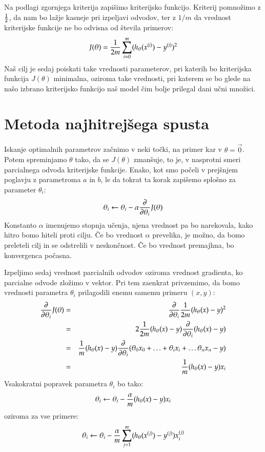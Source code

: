 Na podlagi zgornjega kriterija zapišimo kriterijsko funkcijo. Kriterij
pomnožimo z $1\over 2$, da nam bo lažje kasneje pri izpeljavi odvodov, ter z $1/m$ da vrednost kriterijske funkcije ne bo odvisna od števila primerov:
%
\begin{equation}
J(\theta)={1\over 2m}\sum_{i=0}^m(h_\theta(x^{(i)})-y^{(i)})^2
\end{equation}
%
Naš cilj je sedaj poiskati take vrednosti parameterov, pri katerih bo
kriterijska funkcija $J(\theta)$ minimalna, oziroma take vrednosti,
pri katerem se bo glede na našo izbrano kriterijsko funkcijo naš
model čim bolje prilegal dani učni množici. 

\section{Metoda najhitrejšega spusta}

Iskanje optimalnih parametrov začnimo v neki točki, na primer kar v
$\theta=\vec{0}$. Potem spreminjamo $\theta$ tako, da se $J(\theta)$
zmanšuje, to je, v nasprotni smeri parcialnega odvoda kriterijske
funkcije. Enako, kot smo počeli v prejšnjem poglavju z parametroma $a$
in $b$, le da tokrat ta korak zapišemo splošno za parameter $\theta_i$:
\begin{equation}
  \theta_i\leftarrow\theta_i-\alpha{\partial\over\partial\theta_i}J(\theta)
\end{equation}
%
Konstanto $\alpha$ imenujemo stopnja učenja, njena vrednost pa bo
narekovala, kako hitro bomo hiteli proti cilju. Če bo vrednost
$\alpha$ prevelika, je možno, da bomo preleteli cilj in se odstrelili v
neskončnost. Če bo vrednost premajhna, bo konvergenca počasna.

Izpeljimo sedaj vrednost parcialnih odvodov oziroma vrednost
gradienta, ko parcialne odvode zložimo v vektor. Pri tem zaenkrat privzemimo, da bomo vrednosti parametra $\theta_i$ prilagodili enemu samemu primeru $(x,y)$:
%
\begin{eqnarray}
{\partial\over\partial\theta_i} J(\theta) & = & {\partial\over\partial\theta_i} {1\over 2m}(h_\theta(x)-y)^2 \\
& = & 2{1\over 2m}(h_\theta(x)-y){\partial\over\partial\theta_i}(h_\theta(x)-y) \\
& = & {1\over m}(h_\theta(x)-y){\partial\over\partial\theta_i}(\theta_0 x_0 + \ldots + \theta_i x_i + \ldots \theta_n x_n - y) \\
& = & {1\over m}(h_\theta(x)-y)x_i
\end{eqnarray}
%
Vsakokratni popravek parametra $\theta_i$ bo tako:
\begin{equation}
  \theta_i\leftarrow\theta_i-{\alpha\over m}(h_\theta(x)-y)x_i
\end{equation}
oziroma za vse primere:
\begin{equation}
  \theta_i\leftarrow\theta_i-{\alpha\over m}\sum_{j=1}^m(h_\theta(x^{(j)})-y^{(j)})x_i^{(j)}
\end{equation}

